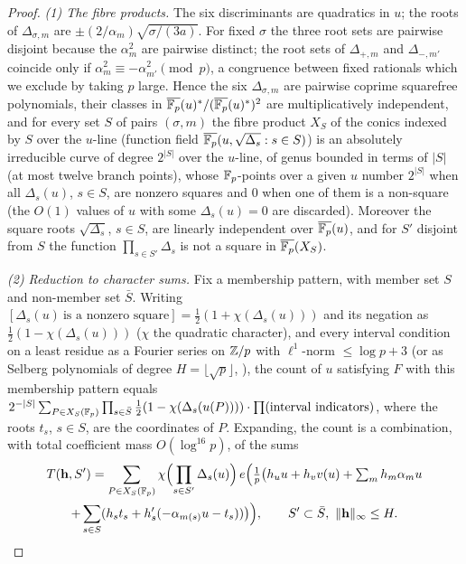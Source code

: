 \begin{proof}
\emph{(1) The fibre products.}  The six discriminants are quadratics in $u$; the roots of $\Delta_{\sigma,m}$ are $\pm(2/\alpha_m)\sqrt{\sigma/(3a)}$.
For fixed $\sigma$ the
three root sets are pairwise disjoint because the $\alpha_m^2$ are pairwise distinct; the root sets of $\Delta_{+,m}$ and $\Delta_{-,m'}$ coincide only if
$\alpha_m^2\equiv-\alpha_{m'}^2\pmod p$, a congruence between fixed rationals which we exclude by taking $p$ large.  Hence the six $\Delta_{\sigma,m}$ are
pairwise coprime squarefree polynomials, their classes in $\overline{\mathbb{F}_p}(u)^*/(\overline{\mathbb{F}_p}(u)^*)^2$ are multiplicatively independent, and for every set
$S$ of pairs $(\sigma,m)$ the fibre product $X_S$ of the conics indexed by $S$ over the $u$-line (function field $\overline{\mathbb{F}_p}(u,\sqrt{\Delta_s}:s\in S)$)
is an absolutely irreducible curve of degree $2^{|S|}$ over the $u$-line, of genus bounded in terms of $|S|$ (at most twelve branch points), whose
$\mathbb{F}_p$-points over a given $u$ number $2^{|S|}$ when all $\Delta_s(u)$, $s\in S$, are nonzero squares and $0$ when one of them is a non-square (the $O(1)$
values of $u$ with some $\Delta_s(u)=0$ are discarded).  Moreover the square roots $\sqrt{\Delta_s}$, $s\in S$, are linearly independent over
$\overline{\mathbb{F}_p}(u)$, and for $S'$ disjoint from $S$ the function $\prod_{s\in S'}\Delta_s$ is not a square in $\overline{\mathbb{F}_p}(X_S)$.

\emph{(2) Reduction to character sums.}  Fix a membership pattern, with member set $S$ and non-member set $\bar S$.  Writing
$[\Delta_s(u)\ \text{is a nonzero square}]=\tfrac12(1+\chi(\Delta_s(u)))$ and its negation as $\tfrac12(1-\chi(\Delta_s(u)))$ ($\chi$ the quadratic
character), and every interval condition on a least residue as a Fourier series on $\mathbb{Z}/p$ with $\ell^1$-norm $\le\log p+3$ (or as Selberg polynomials of
degree $H=\lfloor\sqrt p\rfloor$, \cite{Montgomery,Vaaler}), the count of $u$ satisfying $F$ with this membership pattern equals
$2^{-|S|}\sum_{P\in X_S(\mathbb{F}_p)}\prod_{s\in\bar S}\tfrac12(1-\chi(\Delta_s(u(P))))\cdot\prod(\text{interval indicators})$, where the roots $t_s$, $s\in S$, are the
coordinates of $P$.  Expanding, the count is a combination, with total coefficient mass $O(\log^{16}p)$, of the sums
\begin{multline*}
 T(\mathbf h,S')=\sum_{P\in X_S(\mathbb{F}_p)}\chi\Bigl(\prod_{s\in S'}\Delta_s(u)\Bigr)\,
 e\Bigl(\tfrac1p\bigl(h_uu+h_vv(u)+\textstyle\sum_mh_m\alpha_mu\\
 +\sum_{s\in S}(h_st_s+h'_s(-\alpha_{m(s)}u-t_s))\bigr)\Bigr),
 \qquad S'\subset\bar S,\ \|\mathbf h\|_\infty\le H .
\end{multline*}


\end{proof}
